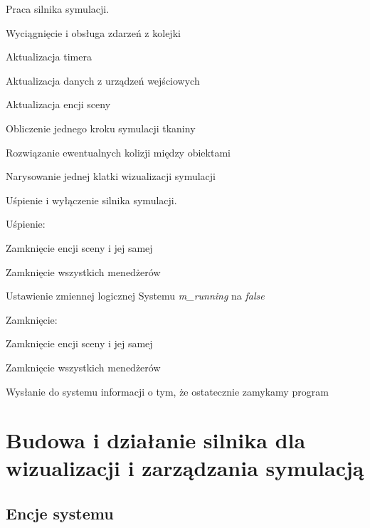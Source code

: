 	\begin{algorithm}
		\label{alg_4_2}
		\caption{Praca silnika symulacji.}	
		
		{
			Wyciągnięcie i obsługa zdarzeń z kolejki
			
			{
				Aktualizacja timera
				
				Aktualizacja danych z urządzeń wejściowych
				
				Aktualizacja encji sceny
				
				\Indp
				
				Obliczenie jednego kroku symulacji tkaniny
				
				\Indm
				
				Rozwiązanie ewentualnych kolizji między obiektami
				
				Narysowanie jednej klatki wizualizacji symulacji
			}
		}	
	\end{algorithm}
	
	\begin{algorithm}
		\label{alg_4_3}
		\caption{Uśpienie i wyłączenie silnika symulacji.}	
		
		Uśpienie:
		
		\Indp
		
			Zamknięcie encji sceny i jej samej
			
			Zamknięcie wszystkich menedżerów
			
			Ustawienie zmiennej logicznej Systemu \emph{m\_running} na \emph{false}
		
		\Indm
		
		Zamknięcie:
		
		\Indp
		
			Zamknięcie encji sceny i jej samej
			
			Zamknięcie wszystkich menedżerów
			
			Wysłanie do systemu informacji o tym, że ostatecznie zamykamy program
		
		\Indm
		
	\end{algorithm}
	
	\section{Budowa i działanie silnika dla wizualizacji i zarządzania symulacją}
	\label{t:praktyka:silnik}
	
	
		\subsection{Encje systemu}
		\label{t:praktyka:silnik:komponent}
		
